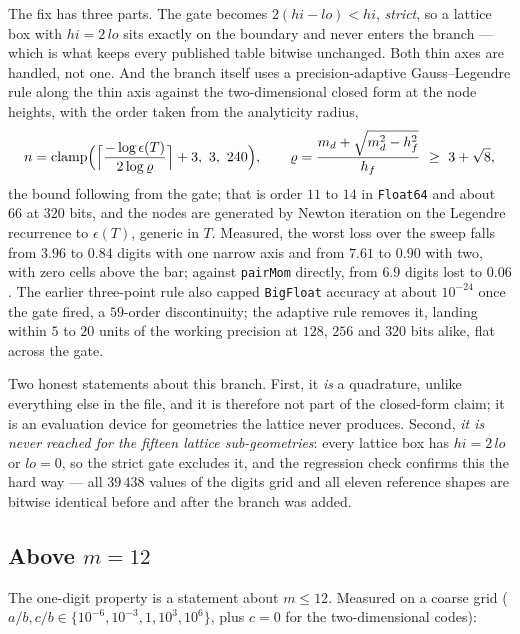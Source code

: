 \documentclass[11pt]{article}
\theoremstyle{remark}
\newcommand{\code}[1]{\texttt{#1}}
\begin{document}
The fix has three parts. The gate becomes $2(hi-lo) < hi$, \emph{strict}, so a lattice box
with $hi = 2\,lo$ sits exactly on the boundary and never enters the branch --- which is
what keeps every published table bitwise unchanged. Both thin axes are handled, not one.
And the branch itself uses a precision-adaptive Gauss--Legendre rule along the thin axis
against the two-dimensional closed form at the node heights, with the order taken from the
analyticity radius,
\begin{equation}
n = \operatorname{clamp}\Bigl(\Bigl\lceil\frac{-\log\epsilon(T)}{2\log\varrho}\Bigr\rceil + 3,\ 3,\ 240\Bigr),
\qquad
\varrho = \frac{m_d + \sqrt{m_d^2 - h_f^2}}{h_f} \ \ge\ 3+\sqrt{8},
\end{equation}
the bound following from the gate; that is order $11$ to $14$ in \code{Float64} and about
$66$ at $320$ bits, and the nodes are generated by Newton iteration on the Legendre
recurrence to $\epsilon(T)$, generic in $T$. Measured, the worst loss over the sweep falls
from $3.96$ to $0.84$ digits with one narrow axis and from $7.61$ to $0.90$ with two, with
zero cells above the bar; against \code{pairMom} directly, from $6.9$ digits lost to
$0.06$. The earlier three-point rule also capped \code{BigFloat} accuracy at about
$10^{-24}$ once the gate fired, a $59$-order discontinuity; the adaptive rule removes it,
landing within $5$ to $20$ units of the working precision at $128$, $256$ and $320$ bits
alike, flat across the gate.

Two honest statements about this branch. First, it \emph{is} a quadrature, unlike
everything else in the file, and it is therefore not part of the closed-form claim; it is
an evaluation device for geometries the lattice never produces. Second, \emph{it is never
reached for the fifteen lattice sub-geometries}: every lattice box has $hi = 2\,lo$ or
$lo = 0$, so the strict gate excludes it, and the regression check confirms this the hard
way --- all $39\,438$ values of the digits grid and all eleven reference shapes are
bitwise identical before and after the branch was added.

\subsection{Above $m = 12$}
\label{sec:highm}

The one-digit property is a statement about $m \le 12$. Measured on a coarse grid
($a/b, c/b \in \{10^{-6},10^{-3},1,10^{3},10^{6}\}$, plus $c = 0$ for the
two-dimensional codes):
\end{document}
